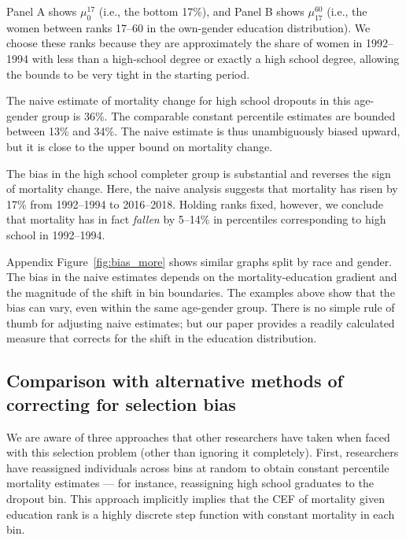 \documentclass[12pt,letterpaper]{article}
\numberwithin{equation}{section}
\begin{document}
Panel A shows $\mu_0^{17}$ (i.e., the bottom 17\%), and Panel B shows $\mu_{17}^{60}$ (i.e., the women between ranks 17--60 in the own-gender education distribution). We choose these ranks because they are approximately the share of women in 1992--1994 with less than a high-school degree or exactly a high school degree, allowing the bounds to be very tight in the starting period.

The naive estimate of mortality change for high school dropouts in this age-gender group is 36\%. The comparable constant percentile estimates are bounded between 13\% and 34\%. The naive estimate is thus unambiguously biased upward, but it is close to the upper bound on mortality change.

The bias in the high school completer group is substantial and reverses the sign of mortality change. Here, the naive analysis suggests that mortality has risen by 17\% from 1992--1994 to 2016--2018. Holding ranks fixed, however, we conclude that mortality has in fact \textit{fallen} by 5--14\% in percentiles corresponding to high school in 1992--1994.

Appendix Figure~\ref{fig:bias_more} shows similar graphs split by race and gender. The bias in the naive estimates depends on the mortality-education gradient and the magnitude of the shift in bin boundaries. The examples above show that the bias can vary, even within the same age-gender group. There is no simple rule of thumb for adjusting naive estimates; but our paper provides a readily calculated measure that corrects for the shift in the education distribution.

\subsection{Comparison with alternative methods of correcting for
  selection bias} We are aware of three approaches that other researchers have taken when faced with this selection problem (other than ignoring it completely). First, researchers have reassigned individuals across bins at random to obtain constant percentile mortality estimates \citep{Meara2008,Bound2015,Hendi2015,Leive2020} --- for instance, reassigning high school graduates to the dropout bin. This approach implicitly implies that the CEF of mortality given education rank is a highly discrete step function with constant mortality in each bin.
\end{document}
